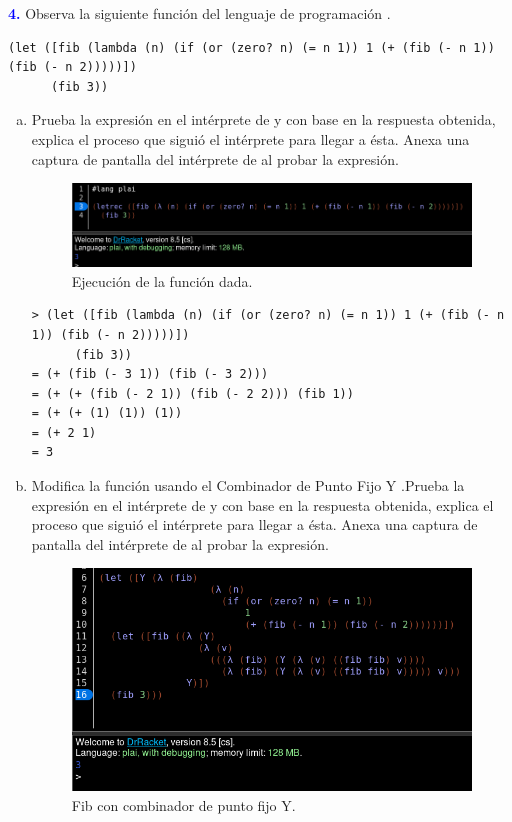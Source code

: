 \Large\textbf{\textcolor{blue}{4.}}
Observa la siguiente función del lenguaje de programación .

\begin{lstlisting}
(let ([fib (lambda (n) (if (or (zero? n) (= n 1)) 1 (+ (fib (- n 1)) (fib (- n 2)))))])
      (fib 3))
\end{lstlisting}

\begin{enumerate}[a.]
\item Prueba la expresión en el intérprete de  y con base en la respuesta 
obtenida, explica el proceso que siguió el intérprete para llegar a ésta. Anexa una 
captura de pantalla del intérprete de  al probar la expresión.

\begin{figure}[h]
  \centering
  \includegraphics[scale=0.5]{./Fib.png}
  \caption{Ejecución de la función dada.}
\end{figure}

\begin{lstlisting}
> (let ([fib (lambda (n) (if (or (zero? n) (= n 1)) 1 (+ (fib (- n 1)) (fib (- n 2)))))])
      (fib 3))
= (+ (fib (- 3 1)) (fib (- 3 2)))
= (+ (+ (fib (- 2 1)) (fib (- 2 2))) (fib 1))
= (+ (+ (1) (1)) (1))
= (+ 2 1)
= 3
\end{lstlisting}
\item Modifica la función usando el Combinador de Punto Fijo Y .Prueba la expresión en 
el intérprete de  y con base en la respuesta obtenida, explica el proceso que 
siguió el intérprete para llegar a ésta. Anexa una captura de pantalla del intérprete 
de  al probar la expresión.

\begin{figure}[h]
  \centering
  \includegraphics[scale=0.3]{./Fib-Y.png}
  \caption{Fib con combinador de punto fijo Y.}
\end{figure}


\end{enumerate}
